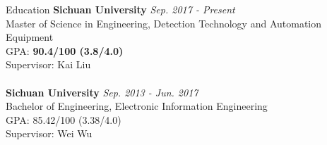 \documentclass{resume} %
\begin{document}
\begin{rSection}{Education}
	{\bf Sichuan University} \hfill {\em Sep. 2017 - Present} 
	\\ Master of Science in Engineering, Detection Technology and Automation Equipment\\ GPA: \textbf{90.4/100 (3.8/4.0)}\\
	Supervisor: Kai Liu\\
	\\{\bf Sichuan University} \hfill {\em Sep. 2013 - Jun. 2017} 
	\\ Bachelor of Engineering, Electronic Information Engineering\\GPA: 85.42/100 (3.38/4.0)\\
	Supervisor: Wei Wu
\end{rSection}
\end{document}
